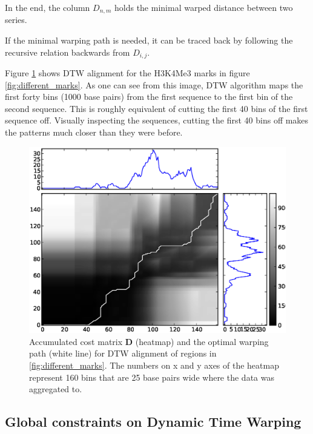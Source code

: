 \documentclass[12pt,a4paper]{article}
\begin{document}
In the end, the column $D_{n,m}$ holds the minimal warped distance between two series.

If the minimal warping path is needed, it can be traced back by following the recursive relation backwards from $D_{i,j}$.

Figure \ref{fig:dtw_alignment_example} shows DTW alignment for the H3K4Me3
marks in figure \ref{fig:different_marks}. As one can see from this image, DTW
algorithm maps the first forty bins (1000 base pairs) from the first sequence to
the first bin of the second sequence. This is roughly equivalent of cutting the first 40 bins
of the first sequence off. Visually inspecting the sequences, cutting the first 40 bins off makes the patterns much closer than they were before.


\begin{figure}[t,b]
    \centering
    \includegraphics[width=\textwidth]{images/introduction/dtw_dist_uc003okl_3_uc021uwd_1.eps}
    \caption{Accumulated cost matrix $\mathbf{D}$ (heatmap) and the optimal
        warping path (white line) for DTW alignment of regions in
        \ref{fig:different_marks}. The numbers on x and y axes of the heatmap
        represent 160 bins that are 25 base pairs wide where the data was aggregated to.
        }
    \label{fig:dtw_alignment_example}
\end{figure}

\subsection{Global constraints on Dynamic Time Warping}
\end{document}
